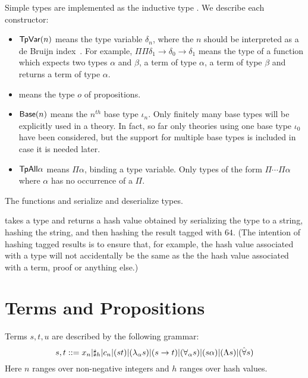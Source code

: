 Simple types are implemented as the inductive type {}.
We describe each constructor:
\begin{itemize}
\item ${\mbox{\constr{TpVar}}}(n)$ means the type variable $\delta_n$, where
the $n$ should be interpreted as a de Bruijn index~\cite{deBruijn72}.
For example, $\Pi \Pi \delta_1 \to \delta_0 \to \delta_1$
means the type
of a function which expects two types $\alpha$ and $\beta$,
a term of type $\alpha$, a term of type $\beta$
and returns a term of type $\alpha$.
\item {} means the type $o$ of propositions.
\item ${\mbox{\constr{Base}}}(n)$ means the $n^{th}$ base type $\iota_n$. Only finitely many base types will be explicitly used in
a theory. In fact, so far only theories using one base type
$\iota_0$ have been considered, but the support for multiple
base types is included in case it is needed later.
\item ${\mbox{\constr{TpAll}}} \alpha$ means $\Pi \alpha$, binding a type variable. Only types of the form $\Pi\cdots\Pi\alpha$
where $\alpha$ has no occurrence of a $\Pi$.
\end{itemize}

The functions {} and {} serialize and deserialize types.

{} takes a type and returns a hash value obtained by serializing the type
to a string, hashing the string, and then hashing the result tagged with $64$.
(The intention of hashing tagged results is to ensure that, for example, the hash value
associated with a type will not accidentally be the same as the the hash value associated
with a term, proof or anything else.)

\section{Terms and Propositions}

Terms $s,t,u$ are described by the following grammar:
$$
s,t ::=  x_n |\mathbf{\sharp}_{h}|c_n|(st)|(\lambda_\alpha s)|(s\to t)|(\forall_\alpha s)|(s \alpha)|(\Lambda s)|(\hat{\forall} s)
$$
Here $n$ ranges over non-negative integers
and $h$ ranges over hash values.

